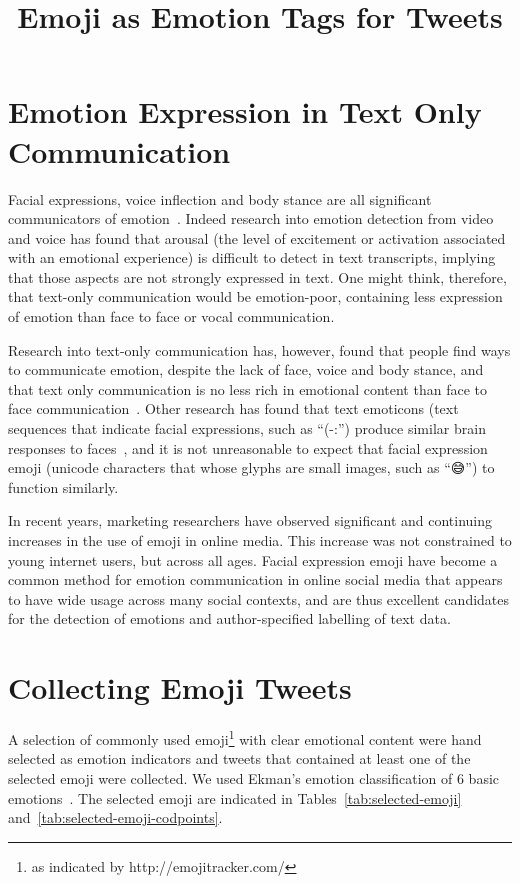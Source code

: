 \documentclass[10pt, a4paper]{article}
\title{Emoji as Emotion Tags for Tweets}
\begin{document}
\maketitleabstract

\section{Emotion Expression in Text Only Communication}
\label{sec:emotion_expression_in_text_only_communication}
Facial expressions, voice inflection and body stance are all significant communicators of emotion~\cite{Johnston2015Apa}. 
Indeed research into emotion detection from video and voice has found that arousal (the level of excitement or activation associated with an emotional experience) is 
difficult to detect in text transcripts, implying that those aspects are not strongly expressed in text.
One might think, therefore, that text-only communication would be emotion-poor, containing less expression of emotion than face to face or vocal communication.

Research into text-only communication has, however, found that people find ways to communicate emotion, despite the lack of face, voice and body stance, and that text only communication is no less rich in emotional content than face to face communication~\cite{Derks2008Role}.
Other research has found that text emoticons (text sequences that indicate facial expressions, such as ``(-:'') produce similar brain responses to faces~\cite{Churches2014Emoticons}, and it is not unreasonable to expect that facial expression emoji (unicode characters that whose glyphs are small images, such as ``😅'') to function similarly.

In recent years, marketing researchers have observed significant and continuing increases in the use of emoji in online media. This increase was not constrained to young internet users, but across all ages. 
Facial expression emoji have become a common method for emotion communication in online social media that appears to have wide usage across many social contexts, and are thus excellent candidates for the detection of emotions and author-specified labelling of text data.


\section{Collecting Emoji Tweets}
A selection of commonly used emoji\footnote{as indicated by http://emojitracker.com/} with clear emotional content were hand selected as emotion indicators and tweets that contained at least one of the selected emoji were collected. We used Ekman's emotion classification of 6 basic emotions~\cite{Ekman1992Argument}. The selected emoji are indicated in Tables~\ref{tab:selected-emoji} and~\ref{tab:selected-emoji-codpoints}.
\end{document}
